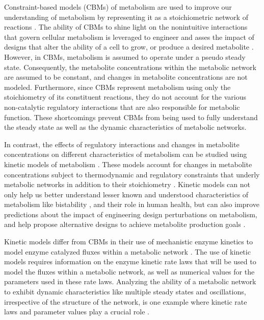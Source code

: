 \documentclass[10pt]{article}
\begin{document}
	Constraint-based models (CBMs) of metabolism are used to improve our understanding of metabolism by representing it as a stoichiometric network of reactions \parencite{Bordbar2014a}. The ability of CBMs to shine light on the nonintuitive interactions that govern cellular metabolism is leveraged to engineer and asses the impact of designs that alter the ability of a cell to grow, or produce a desired metabolite \parencite{Maia2016}. However, in CBMs, metabolism is assumed to operate under a pseudo steady state. Consequently, the metabolite concentrations within the metabolic network are assumed to be constant, and changes in metabolite concentrations are not modeled. Furthermore, since CBMs represent metabolism using only the stoichiometry of its constituent reactions, they do not account for the various non-catalytic regulatory interactions that are also responsible for metabolic function. These shortcomings prevent CBMs from being used to fully understand the steady state as well as the dynamic characteristics of metabolic networks. 
	
	In contrast, the effects of regulatory interactions and changes in metabolite concentrations on different characteristics of metabolism can be studied using kinetic models of metabolism \parencite{Saa2017}. These models account for changes in metabolite concentrations subject to thermodynamic and regulatory constraints that underly metabolic networks in addition to their stoichiometry \parencite{Link2014}. Kinetic models can not only help us better understand lesser known and understood characteristics of metabolism like bistability \parencite{Kotte2014}, and their role in human health, but can also improve predictions about the impact of engineering design perturbations on metabolism, and help propose alternative designs to achieve metabolite production goals \parencite{Khodayari2016}. 
	
	Kinetic models differ from CBMs in their use of mechanistic enzyme kinetics to model enzyme catalyzed fluxes within a metabolic network \parencite{Srinivasan2015,Saa2017}. The use of kinetic models requires information on the enzyme kinetic rate laws that will be used to model the fluxes within a metabolic network, as well as numerical values for the parameters used in these rate laws. Analyzing the ability of a metabolic network to exhibit dynamic characteristics like multiple steady states and oscillations, irrespective of the structure of the network, is one example where kinetic rate laws and parameter values play a crucial role \parencite{Srinivasan2017}. 
	
\end{document}
